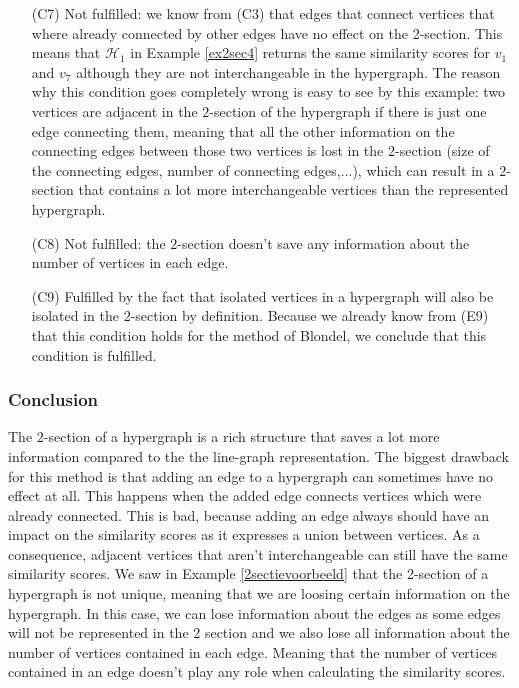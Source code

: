 \documentclass[a4paper,11pt]{report}
\newcommand{\hgrafeen}{\mathcal{H}}
\begin{document}
\begin{itemize}
\begin{proof}
 \end{proof}
 Because the $2$-section preserves interchangeable vertices and we use the method of Blondel for which we already proved
 in (E6) that this condition holds, the result follows.
   
     \item[(C7)] Not fulfilled: we know from (C3) that edges that connect 
     vertices that where already connected by other edges have no effect on
   the 2-section. This means that $\hgrafeen_1$ in Example \ref{ex2sec4}
     returns the same similarity scores for $v_1$ and $v_7$ although they are not 
     interchangeable in the hypergraph. The reason why this condition goes 
     completely wrong is easy to see by this example: two vertices are adjacent in the 
     $2$-section of the hypergraph if there is just one edge connecting them, 
     meaning that all the other information on the connecting edges between those two vertices is lost in the $2$-section (size of the connecting edges,
     number of connecting edges,...), which can result in a $2$-section that contains a lot more interchangeable vertices than the
     represented hypergraph.   
     
     \item [(C8)] Not fulfilled: the $2$-section doesn't save any information 
     about the number of vertices in each edge. 
  \item[(C9)] Fulfilled by the fact that isolated vertices in a hypergraph will 
  also be isolated in the $2$-section by definition. Because we already know from (E9) that this condition
  holds for the method of Blondel, we conclude that 
  this condition is fulfilled.
  \end{itemize}  

\subsubsection{Conclusion}
The $2$-section of a hypergraph is a rich structure that 
saves a lot more information compared to the the line-graph representation. The biggest drawback for this method is that 
adding an edge to a hypergraph can sometimes have no effect at all. This happens when 
the added edge connects vertices which were already connected. This is bad, because adding an edge always should have an impact on 
  the similarity scores as it expresses a union between vertices. As a consequence, adjacent vertices that aren't interchangeable
  can still have the same similarity scores. We saw in Example \ref{2sectievoorbeeld} that
  the 2-section of a hypergraph is not unique, meaning that we are loosing certain
  information on the hypergraph. In this case, we can lose information about 
  the edges as some edges will not be represented in the 2 section and we also lose 
  all information about 
  the number of vertices contained in each edge. Meaning that the number of vertices
  contained in an edge doesn't play any role when calculating the similarity scores. 
  
\end{document}

